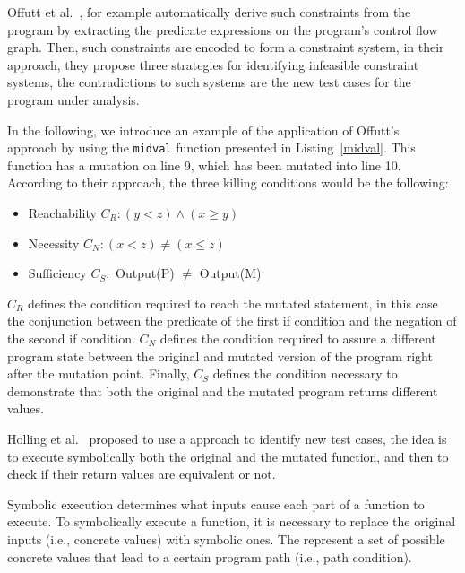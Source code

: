Offutt et al.~\cite{offutt1997automatically}, for example automatically derive such constraints from the program by extracting the predicate expressions on the program's control flow graph.
Then, such constraints are encoded to form a constraint system, in their approach, they propose three strategies for identifying infeasible constraint systems, the contradictions to such systems are the new test cases for the program under analysis.



In the following, we introduce an example of the application of Offutt's~\cite{offutt1997automatically} approach by using the \texttt{midval} function presented in Listing~\ref{midval}. This function has a mutation on line 9, which has been mutated into line 10. According to their approach, the three killing conditions would be the following:

\begin{itemize}
	\item Reachability $C_R: (y < z) \wedge (x \geq y)$
	\item Necessity $C_N: (x < z) \neq (x \leq z)$
	\item Sufficiency $C_S:$ Output(P) $\neq$ Output(M)
\end{itemize}

$C_R$ defines the condition required to reach the mutated statement, in this case the conjunction between the predicate of the first if condition and the negation of the second if condition. $C_N$ defines the condition required to assure a different program state between the original and mutated version of the program right after the mutation point. Finally, $C_S$ defines the condition necessary to demonstrate that both the original and the mutated program returns different values.

Holling et al.~\cite{holling2016nequivack} proposed to use a  approach to identify new test cases, the idea is to execute symbolically both the original and the mutated function, and then to check if their return values are equivalent or not. 


Symbolic execution determines what inputs cause each part of a function to execute. To symbolically execute a function, it is necessary to replace the original inputs (i.e., concrete values) with symbolic ones. The  represent a set of possible concrete values that lead to a certain program path (i.e., path condition). 

